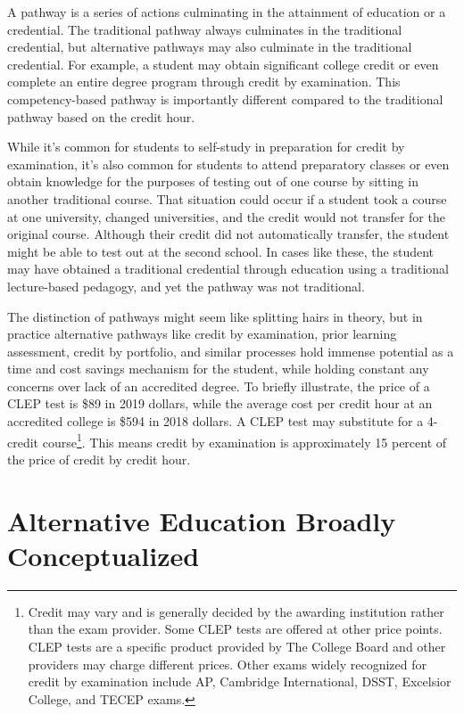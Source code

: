 \documentclass[AER]{/Users/zyl357/Documents/GitHub/research-dissertation-case-for-alt-ed/papers/alt-ed-survey/aea-latex-templates/AEA}
\begin{document}
A pathway is a series of actions culminating in the attainment of
education or a credential. The traditional pathway always culminates in
the traditional credential, but alternative pathways may also culminate in
the traditional credential. For example, a student may obtain significant
college credit or even complete an entire degree program through credit by
examination. This competency-based pathway is importantly different
compared to the traditional pathway based on the credit hour.

While it’s common for students to self-study in preparation for credit by
examination, it’s also common for students to attend preparatory classes
or even obtain knowledge for the purposes of testing out of one course by
sitting in another traditional course. That situation could occur if a
student took a course at one university, changed universities, and the
credit would not transfer for the original course. Although their credit
did not automatically transfer, the student might be able to test out at
the second school. In cases like these, the student may have obtained a
traditional credential through education using a traditional lecture-based
pedagogy, and yet the pathway was not traditional.

The distinction of pathways might seem like splitting hairs in theory, but
in practice alternative pathways like credit by examination, prior
learning assessment, credit by portfolio, and similar processes hold
immense potential as a time and cost savings mechanism for the student,
while holding constant any concerns over lack of an accredited degree. To
briefly illustrate, the price of a CLEP test is \$89 in 2019 dollars\cite{collegeboard_2019}, while
the average cost per credit hour at an accredited college is \$594 in 2018
dollars\cite{kirkham2018study}. A CLEP test may substitute for a 4-credit course\footnote{Credit
may vary and is generally decided by the awarding institution rather than
the exam provider. Some CLEP tests are offered at other price points. CLEP
tests are a specific product provided by The College Board and other
providers may charge different prices. Other exams widely recognized for
credit by examination include AP, Cambridge International, DSST, Excelsior
College, and TECEP exams.}. This means
credit by examination is approximately 15 percent of the price of credit by
credit hour.

\section{Alternative Education Broadly Conceptualized}
\end{document}
